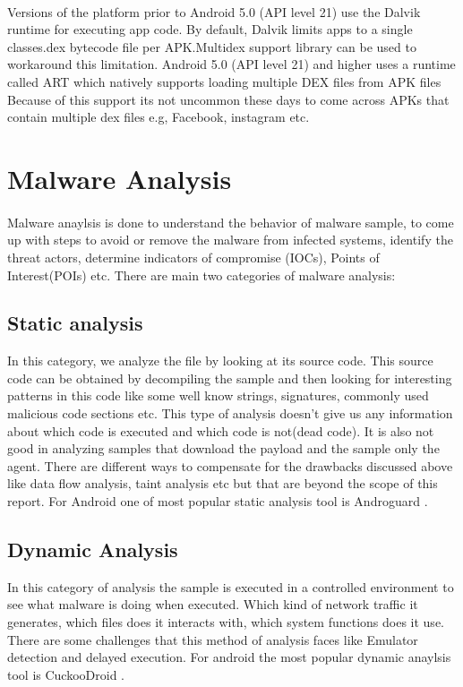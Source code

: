 \documentclass[../main.tex]{subfile}
\begin{document}
				\paragraph{} Versions of the platform prior to Android 5.0 (API level 21) use the Dalvik runtime for executing app code. By default, Dalvik limits apps to a single classes.dex bytecode file per APK.Multidex support library can be used to workaround this limitation. Android 5.0 (API level 21) and higher uses a runtime called ART which natively supports loading multiple DEX files from APK files Because of this support its not uncommon these days to come across APKs that contain multiple dex files e.g, Facebook, instagram etc. \cite{multidex}
		\section{Malware Analysis}\label{sec:malware_analysis}
		\paragraph{} Malware anaylsis is done to understand the behavior of malware sample, to come up with steps to avoid or remove the malware from infected systems, identify the threat actors, determine indicators of compromise (IOCs), Points of Interest(POIs) etc. There are main two categories of malware analysis:
		\subsection[Static Analysis]{Static analysis} In this category, we analyze the file by looking at its source code. This source code can be obtained by decompiling the sample and then looking for interesting patterns in this code like some well know strings, signatures, commonly used malicious code sections etc. This type of analysis doesn't give us any information about which code is executed and which code is not(dead code). It is also not good in analyzing samples that download the payload and the sample only the agent. There are different ways to compensate for the drawbacks discussed above like data flow analysis, taint analysis etc but that are beyond the scope of this report. For Android one of most popular static analysis tool is Androguard \cite{desnos2017androguard}.
		\subsection[Dynamic Analysis]{Dynamic Analysis} In this category of analysis the sample is executed in a controlled environment to see what malware is doing when executed. Which kind of network traffic it generates, which files does it interacts with, which system functions does it use. There are some challenges that this method of analysis faces like Emulator detection and delayed execution. For android the most popular dynamic anaylsis tool is CuckooDroid \cite{cuckoodroid_github}.
		
\end{document}
